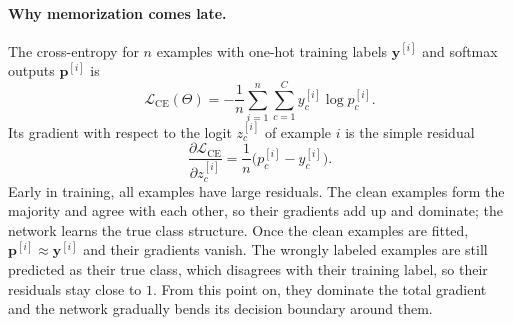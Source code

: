 \paragraph{Why memorization comes late.}
The cross-entropy for $n$ examples with one-hot training labels
$\mathbf y^{[i]}$ and softmax outputs $\mathbf p^{[i]}$ is
\begin{equation}
  \mathcal L_{\mathrm{CE}}(\Theta) = -\frac1n\sum_{i=1}^{n}\sum_{c=1}^{C}
    y^{[i]}_c \log p^{[i]}_c .
  \label{eq:weak-ce}
\end{equation}
Its gradient with respect to the logit $z^{[i]}_c$ of example $i$ is the
simple residual
\begin{equation}
  \frac{\partial \mathcal L_{\mathrm{CE}}}{\partial z^{[i]}_c}
    = \frac1n\bigl(p^{[i]}_c - y^{[i]}_c\bigr).
  \label{eq:ce-grad}
\end{equation}
Early in training, all examples have large residuals. The clean examples
form the majority and agree with each other, so their gradients add up and
dominate; the network learns the true class structure. Once the clean
examples are fitted, $\mathbf p^{[i]}\approx\mathbf y^{[i]}$ and their
gradients vanish. The wrongly labeled examples are still predicted as their
true class, which disagrees with their training label, so their residuals
stay close to $1$. From this point on, they dominate the total gradient and
the network gradually bends its decision boundary around them.

